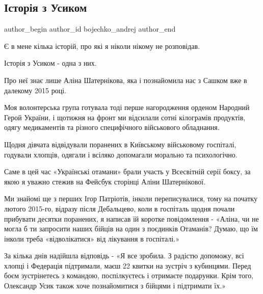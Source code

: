  
 
 
 
 
 
\subsection{Історія з Усиком}
\label{sec:27_09_2021.fb.bojechko_andrej.1.istoria_z_usikom}
 
\ifcmt
 author_begin
   author_id bojechko_andrej
 author_end
\fi

Є в мене кілька історій, про які я ніколи нікому не розповідав.

Історія з Усиком - одна з них.

Про неї знає лише Аліна Шатернікова, яка і познайомила нас  з Сашком вже  в
далекому  2015 році.

Моя волонтерська група готувала  тоді перше нагородження орденом Народний Герой
України, і щотижня на фронт ми відсилали сотні кілограмів продуктів, одягу
медикаментів та різного специфічного військового обладнання. 

Щодня дівчата відвідували поранених в Київському військовому госпіталі,
годували хлопців, одягали і всіляко допомагали морально та психологічно.

Саме в цей час «Українські отамани» брали участь у Всесвітній серії боксу, за
якою я уважно стежив на Фейсбук сторінці Аліни Шатернікової.

Ми знайомі ще з перших Ігор Патріотів, інколи переписувалися, тому на початку
лютого 2015-го, відразу після Дебальцево, коли в госпіталь щодня почали
прибувати десятки поранених, я написав їй коротке повідомлення - «Аліна, чи не
могла б ти запросити наших бійців на один з поєдинків Отаманів? Думаю, що їм
інколи треба «відволікатися» від лікування в госпіталі.»

За кілька днів надійшла відповідь - «Я все зробила. З радістю допоможу, всі
хлопці і Федерація підтримали, маєш 22 квитки на зустріч з кубинцями. Перед
боєм зустрінетесь з командою,  поспілкуєтесь і отримаєте подарунки. Крім того,
Олександр Усик також хоче познайомитися з бійцями  і підтримати їх.»

